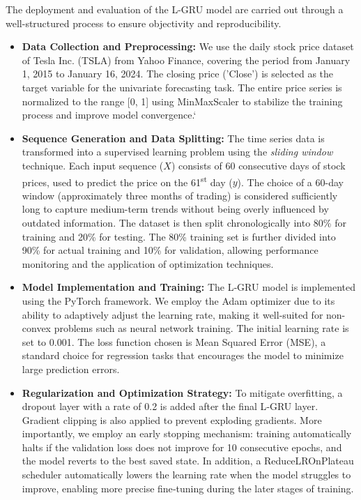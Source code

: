 \documentclass{cys}
\begin{document}
  The deployment and evaluation of the L-GRU model are carried out through a well-structured process to ensure objectivity and reproducibility.
  \begin{itemize}
      \item \textbf{Data Collection and Preprocessing:}  
      We use the daily stock price dataset of Tesla Inc. (TSLA) from Yahoo Finance, covering the period from January 1, 2015 to January 16, 2024. The closing price ('Close') is selected as the target variable for the univariate forecasting task. The entire price series is normalized to the range [0, 1] using MinMaxScaler to stabilize the training process and improve model convergence.`
      \item \textbf{Sequence Generation and Data Splitting:}
      The time series data is transformed into a supervised learning problem using the \textit{sliding window} technique. Each input sequence ($X$) consists of 60 consecutive days of stock prices, used to predict the price on the 61\textsuperscript{st} day ($y$). The choice of a 60-day window (approximately three months of trading) is considered sufficiently long to capture medium-term trends without being overly influenced by outdated information.
      The dataset is then split chronologically into 80\% for training and 20\% for testing. The 80\% training set is further divided into 90\% for actual training and 10\% for validation, allowing performance monitoring and the application of optimization techniques.
      \item \textbf{Model Implementation and Training:}  
      The L‑GRU model is implemented using the PyTorch framework. We employ the Adam optimizer \cite{kingma2014adam} due to its ability to adaptively adjust the learning rate, making it well-suited for non-convex problems such as neural network training. The initial learning rate is set to 0.001.
      The loss function chosen is Mean Squared Error (MSE), a standard choice for regression tasks that encourages the model to minimize large prediction errors.
      \item \textbf{Regularization and Optimization Strategy:}
      To mitigate overfitting, a dropout layer with a rate of 0.2 is added after the final L‑GRU layer. Gradient clipping is also applied to prevent exploding gradients. More importantly, we employ an early stopping mechanism: training automatically halts if the validation loss does not improve for 10 consecutive epochs, and the model reverts to the best saved state. In addition, a ReduceLROnPlateau scheduler automatically lowers the learning rate when the model struggles to improve, enabling more precise fine‑tuning during the later stages of training.   
  \end{itemize}
\end{document}
